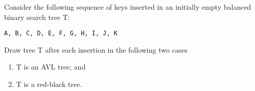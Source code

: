 Consider the following sequence of keys inserted in an initially empty
balanced binary search tree T:

{\tt A, B, C, D, E, F, G, H, I, J, K}

Draw tree T after each insertion in the following two cases

\begin{enumerate}

\item  T is an AVL tree; and

\item  T is a red-black tree.

\end{enumerate}
